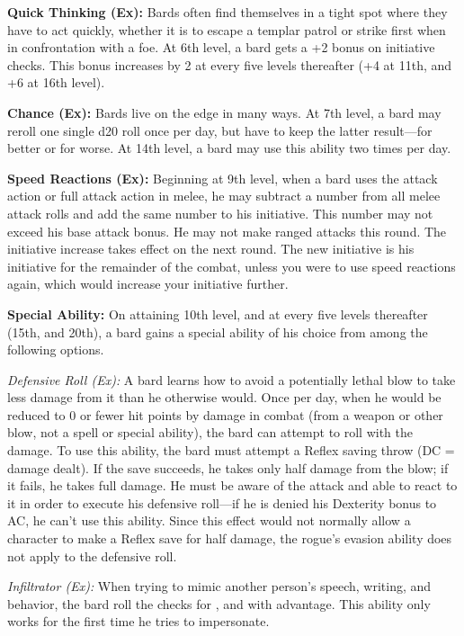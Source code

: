 \textbf{Quick Thinking (Ex):} Bards often find themselves in a tight spot where they have to act quickly, whether it is to escape a templar patrol or strike first when in confrontation with a foe. At 6th level, a bard gets a +2 bonus on initiative checks. This bonus increases by 2 at every five levels thereafter (+4 at 11th, and +6 at 16th level).

\textbf{Chance (Ex):} Bards live on the edge in many ways. At 7th level, a bard may reroll one single d20 roll once per day, but have to keep the latter result---for better or for worse. At 14th level, a bard may use this ability two times per day.

\textbf{Speed Reactions (Ex):} Beginning at 9th level, when a bard uses the attack action or full attack action in melee, he may subtract a number from all melee attack rolls and add the same number to his initiative. This number may not exceed his base attack bonus. He may not make ranged attacks this round. The initiative increase takes effect on the next round. The new initiative is his initiative for the remainder of the combat, unless you were to use speed reactions again, which would increase your initiative further.

\textbf{Special Ability:} On attaining 10th level, and at every five levels thereafter (15th, and 20th), a bard gains a special ability of his choice from among the following options.

\textit{Defensive Roll (Ex):} A bard learns how to avoid a potentially lethal blow to take less damage from it than he otherwise would. Once per day, when he would be reduced to 0 or fewer hit points by damage in combat (from a weapon or other blow, not a spell or special ability), the bard can attempt to roll with the damage. To use this ability, the bard must attempt a Reflex saving throw (DC = damage dealt). If the save succeeds, he takes only half damage from the blow; if it fails, he takes full damage. He must be aware of the attack and able to react to it in order to execute his defensive roll---if he is denied his Dexterity bonus to AC, he can't use this ability. Since this effect would not normally allow a character to make a Reflex save for half damage, the rogue's evasion ability does not apply to the defensive roll.

\textit{Infiltrator (Ex):} When trying to mimic another person's speech, writing, and behavior, the bard roll the checks for ,  and  with advantage. This ability only works for the first time he tries to impersonate.

